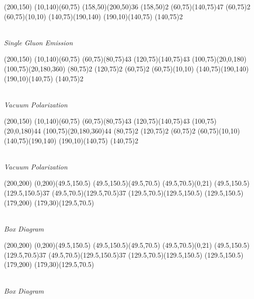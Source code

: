 \documentclass{article}
\begin{document}
\begin{center}
	\begin{axopicture}(200,150)
		\Line[arrow](10,140)(60,75)
		\Gluon(158,50)(200,50){3}{6}
		\Vertex(158,50){2}
		\Photon(60,75)(140,75){4}{7}
		\Vertex(60,75){2}
		\Line[arrow](60,75)(10,10)
		\Line[arrow](140,75)(190,140)
		\Line[arrow](190,10)(140,75)
		\Vertex(140,75){2}
	\end{axopicture}
\\ {\sl Single Gluon Emission}
\end{center}

\begin{center}
	\begin{axopicture}(200,150)
		\Line[arrow](10,140)(60,75)
		\Gluon(60,75)(80,75){4}{3}
		\Gluon(120,75)(140,75){4}{3}
		\Arc[arrow](100,75)(20,0,180)
		\Arc[arrow](100,75)(20,180,360)
		\Vertex(80,75){2}
		\Vertex(120,75){2}
		\Vertex(60,75){2}
		\Line[arrow](60,75)(10,10)
		\Line[arrow](140,75)(190,140)
		\Line[arrow](190,10)(140,75)
		\Vertex(140,75){2}
	\end{axopicture}
	\\ {\sl Vacuum Polarization}
\end{center}


\begin{center}
	\begin{axopicture}(200,150)
		\Line[arrow](10,140)(60,75)
		\Gluon(60,75)(80,75){4}{3}
		\Gluon(120,75)(140,75){4}{3}
		\GluonArc(100,75)(20,0,180){4}{4}
		\GluonArc(100,75)(20,180,360){4}{4}
		\Vertex(80,75){2}
		\Vertex(120,75){2}
		\Vertex(60,75){2}
		\Line[arrow](60,75)(10,10)
		\Line[arrow](140,75)(190,140)
		\Line[arrow](190,10)(140,75)
		\Vertex(140,75){2}
	\end{axopicture}
	\\ {\sl Vacuum Polarization}
\end{center}


\begin{center}
	\begin{axopicture}(200,200)
		\Line[arrow](0,200)(49.5,150.5)
		\Line[arrow](49.5,150.5)(49.5,70.5)
		\Line[arrow](49.5,70.5)(0,21)
		\Photon(49.5,150.5)(129.5,150.5){3}{7}
		\Photon(49.5,70.5)(129.5,70.5){3}{7}
		\Line[arrow](129.5,70.5)(129.5,150.5)
		\Line[arrow](129.5,150.5)(179,200)
		\Line[arrow](179,30)(129.5,70.5)
	\end{axopicture}
	\\ {\sl Box Diagram}
\end{center}


	\begin{axopicture}(200,200)
		\Line[arrow](0,200)(49.5,150.5)
		\Line[arrow](49.5,150.5)(49.5,70.5)
		\Line[arrow](49.5,70.5)(0,21)
		\Photon(49.5,150.5)(129.5,70.5){3}{7}
		\Photon(49.5,70.5)(129.5,150.5){3}{7}
		\Line[arrow](129.5,70.5)(129.5,150.5)
		\Line[arrow](129.5,150.5)(179,200)
		\Line[arrow](179,30)(129.5,70.5)
	\end{axopicture}
	\\ {\sl Box Diagram}
\end{document}

